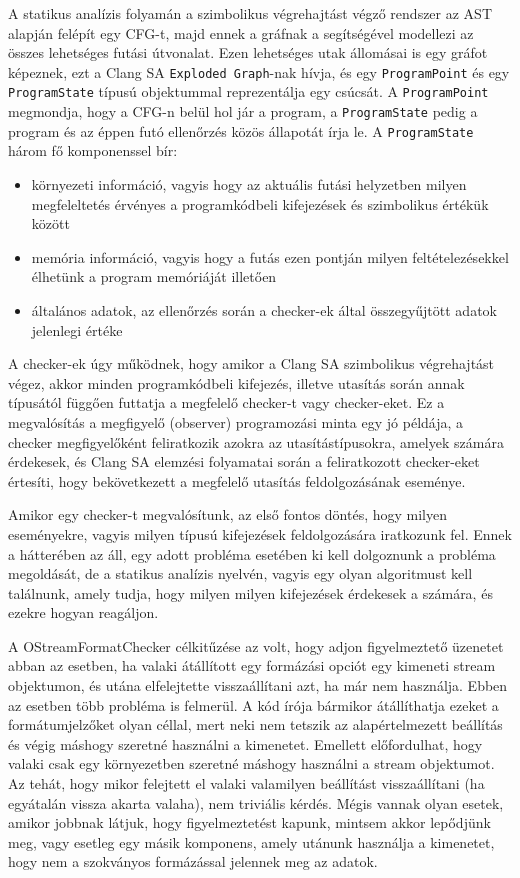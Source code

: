 \documentclass[a4paper,12pt]{report}
\begin{document}
A statikus analízis folyamán a szimbolikus végrehajtást végző rendszer az AST alapján felépít egy CFG-t, majd ennek a gráfnak a segítségével modellezi az összes lehetséges futási útvonalat. Ezen lehetséges utak állomásai is egy gráfot képeznek, ezt a Clang SA \texttt{Exploded Graph}-nak hívja, és egy \texttt{ProgramPoint} és egy \texttt{ProgramState} típusú objektummal reprezentálja egy csúcsát. A \texttt{ProgramPoint} megmondja, hogy a CFG-n belül hol jár a program, a \texttt{ProgramState} pedig a program és az éppen futó ellenőrzés közös állapotát írja le. A \texttt{ProgramState} három fő komponenssel bír:

\begin{itemize}
\item környezeti információ, vagyis hogy az aktuális futási helyzetben milyen megfeleltetés érvényes a programkódbeli kifejezések és szimbolikus értékük között
\item memória információ, vagyis hogy a futás ezen pontján milyen feltételezésekkel élhetünk a program memóriáját illetően
\item általános adatok, az ellenőrzés során a checker-ek által összegyűjtött adatok jelenlegi értéke
\end{itemize}

A checker-ek úgy működnek, hogy amikor a Clang SA szimbolikus végrehajtást végez, akkor minden programkódbeli kifejezés, illetve utasítás során annak típusától függően futtatja a megfelelő checker-t vagy checker-eket. Ez a megvalósítás a megfigyelő (observer) programozási minta egy jó példája, a checker megfigyelőként feliratkozik azokra az utasítástípusokra, amelyek számára érdekesek, és Clang SA elemzési folyamatai során a feliratkozott checker-eket értesíti, hogy bekövetkezett a megfelelő utasítás feldolgozásának eseménye.

Amikor egy checker-t megvalósítunk, az első fontos döntés, hogy milyen eseményekre, vagyis milyen típusú kifejezések feldolgozására iratkozunk fel. Ennek a hátterében az áll, egy adott probléma esetében ki kell dolgoznunk a probléma megoldását, de a statikus analízis nyelvén, vagyis egy olyan algoritmust kell találnunk, amely tudja, hogy milyen milyen kifejezések érdekesek a számára, és ezekre hogyan reagáljon.

A OStreamFormatChecker célkitűzése az volt, hogy adjon figyelmeztető üzenetet abban az esetben, ha valaki átállított egy formázási opciót egy kimeneti stream objektumon, és utána elfelejtette visszaállítani azt, ha már nem használja. Ebben az esetben több probléma is felmerül. A kód írója bármikor átállíthatja ezeket a formátumjelzőket olyan céllal, mert neki nem tetszik az alapértelmezett beállítás és végig máshogy szeretné használni a kimenetet. Emellett előfordulhat, hogy valaki csak egy környezetben szeretné máshogy használni a stream objektumot. Az tehát, hogy mikor felejtett el valaki valamilyen beállítást visszaállítani (ha egyátalán vissza akarta valaha), nem triviális kérdés. Mégis vannak olyan esetek, amikor jobbnak látjuk, hogy figyelmeztetést kapunk, mintsem akkor lepődjünk meg, vagy esetleg egy másik komponens, amely utánunk használja a kimenetet, hogy nem a szokványos formázással jelennek meg az adatok.
\end{document}
